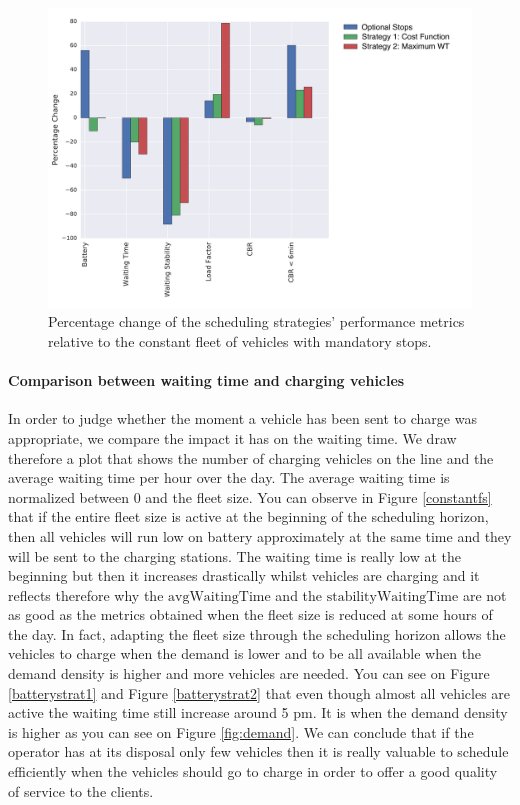 \documentclass[12pt,a4paper]{article}
\begin{document}
\begin{figure}[h] 
  \centering
\includegraphics[scale=0.55]{./images/strategyCompare.pdf}
  \caption{Percentage change of the scheduling strategies' performance metrics relative to the constant fleet of vehicles with mandatory stops.}
\label{strategyCompare}
\end{figure}

\paragraph{Comparison between waiting time and charging vehicles}
In order to judge whether the moment a vehicle has been sent to charge was appropriate, we compare the impact it has on the waiting time. We draw therefore a plot that shows the number of charging vehicles on the line and the average waiting time per hour over the day. The average waiting time is normalized between 0 and the fleet size. You can observe in Figure \ref{constantfs} that if the entire fleet size is active at the beginning of the scheduling horizon, then all vehicles will run low on battery approximately at the same time and they will be sent to the charging stations. The waiting time is really low at the beginning but then it increases drastically whilst vehicles are charging and it reflects therefore why the $\text{avgWaitingTime}$ and the $\text{stabilityWaitingTime}$ are not as good as the metrics obtained when the fleet size is reduced at some hours of the day. In fact, adapting the fleet size through the scheduling horizon allows the vehicles to charge when the demand is lower and to be all available when the demand density is higher and more vehicles are needed. You can see on Figure \ref{batterystrat1} and Figure \ref{batterystrat2} that even though almost all vehicles are active the waiting time still increase around 5 pm. It is when the demand density is higher as you can see on Figure \ref{fig:demand}. We can conclude that if the operator has at its disposal only few vehicles then it is really valuable to schedule efficiently when the vehicles should go to charge in order to offer a good quality of service to the clients. 
\end{document}
